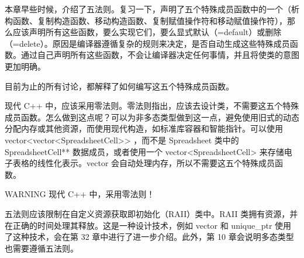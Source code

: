 
本章早些时候，介绍了五法则。复习一下，声明了五个特殊成员函数中的一个（析构函数、复制构造函数、移动构造函数、复制赋值操作符和移动赋值操作符），那么应该声明所有这些函数，要么实现它们，要么显式默认（=default）或删除（=delete）。原因是编译器遵循复杂的规则来决定，是否自动生成这些特殊成员函数。通过自己声明所有这些函数，不会让编译器决定任何事情，并且将使类的意图更加明确。

目前为止的所有讨论，都解释了如何编写这五个特殊成员函数。

现代 C++ 中，应该采用零法则。零法则指出，应该去设计类，不需要这五个特殊成员函数。怎么做到这点呢？可以为非多态类型做到这一点，避免使用旧式的动态分配内存或其他资源，而使用现代构造，如标准库容器和智能指针。可以使用 vector<vector<SpreadsheetCell>{}> ，而不是 Spreadsheet 类中的 SpreadsheetCell** 数据成员，或者使用一个 vector<SpreadsheetCell> 来存储电子表格的线性化表示。vector 会自动处理内存，所以不需要这五个特殊成员函数。

\begin{myWarning}{WARNING}
现代 C++ 中，采用零法则！
\end{myWarning}

五法则应该限制在自定义资源获取即初始化（RAII）类中。RAII 类拥有资源，并在正确的时间处理其释放。这是一种设计技术，例如 vector 和 unique\_ptr 使用了这种技术，会在第 32 章中进行了进一步介绍。此外，第 10 章会说明多态类型也需要遵循五法则。









